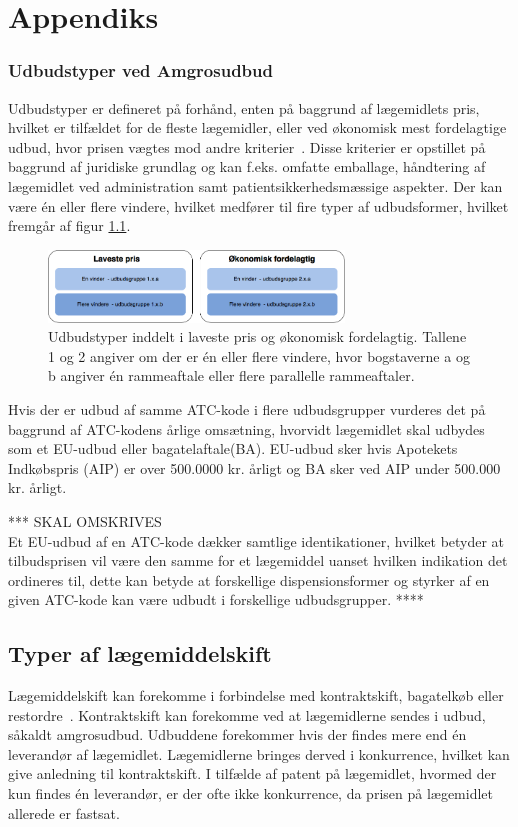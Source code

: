 \chapter{Appendiks}

\subsection{Udbudstyper ved Amgrosudbud}
Udbudstyper er defineret på forhånd, enten på baggrund af lægemidlets pris, hvilket er tilfældet for de fleste lægemidler, eller ved økonomisk mest fordelagtige udbud, hvor prisen vægtes mod andre kriterier~\citep{Amgros2018a}. Disse kriterier er opstillet på baggrund af juridiske grundlag og kan f.eks. omfatte emballage, håndtering af lægemidlet ved administration samt patientsikkerhedsmæssige aspekter. Der kan være én eller flere vindere, hvilket medfører til fire typer af udbudsformer, hvilket fremgår af figur \ref{fig:TypeUdbud}.~\citep{Amgros2018a}

\begin{figure}[H]\centering
	\includegraphics[width=0.7\textwidth]{billeder/TypeUdbud.png} 
	\caption{Udbudstyper inddelt i laveste pris og økonomisk fordelagtig. Tallene 1 og 2 angiver om der er én eller flere vindere, hvor bogstaverne a og b angiver én rammeaftale eller flere parallelle rammeaftaler. ~\citep{Amgros2018a}}
	\label{fig:TypeUdbud}  
\end{figure}

Hvis der er udbud af samme ATC-kode i flere udbudsgrupper vurderes det på baggrund af ATC-kodens årlige omsætning, hvorvidt lægemidlet  skal udbydes som et EU-udbud eller bagatelaftale(BA). EU-udbud sker hvis Apotekets Indkøbspris (AIP) er over 500.0000 kr. årligt og BA sker ved AIP under 500.000 kr. årligt. 

*** SKAL OMSKRIVES \\
Et EU-udbud af en ATC-kode dækker samtlige identikationer, hvilket betyder at tilbudsprisen vil være den samme for et lægemiddel uanset hvilken indikation det ordineres til, dette kan betyde at forskellige dispensionsformer og styrker af en given ATC-kode kan være udbudt i forskellige udbudsgrupper. 
****

\section{Typer af lægemiddelskift}
Lægemiddelskift kan forekomme i forbindelse med kontraktskift, bagatelkøb eller restordre~\citep{Amgros2015}. Kontraktskift kan forekomme ved at lægemidlerne sendes i udbud, såkaldt amgrosudbud. Udbuddene forekommer hvis der findes mere end én leverandør af lægemidlet. Lægemidlerne bringes derved i konkurrence, hvilket kan give anledning til kontraktskift. I tilfælde af patent på lægemidlet, hvormed der kun findes én leverandør, er der ofte ikke konkurrence, da prisen på lægemidlet allerede er fastsat.~\citep{Amgros2015} 

